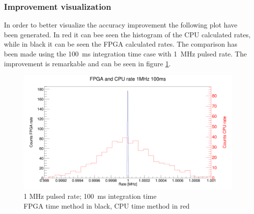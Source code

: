 \subsubsection{Improvement visualization}
\noindent In order to better visualize the accuracy improvement the following plot have been generated. In red it can bee seen the histogram of the CPU calculated rates, while in black it can be seen the FPGA calculated rates. The comparison has been made using the 100~ms integration time case with 1~MHz pulsed rate. The improvement is remarkable and can be seen in figure \ref{fig:FPGA_and_CPU_rate_1MHz_100ms}. 
\begin{figure}[H]
	\centering
	\includegraphics[width=0.95\linewidth]{IMG/ch5/RateMeasures/FPGA_and_CPU_rate_1MHz_100ms}
	\caption{1 MHz pulsed rate; 100~ms integration time\\FPGA time method in black, CPU time method in red}
	\label{fig:FPGA_and_CPU_rate_1MHz_100ms}
\end{figure}










